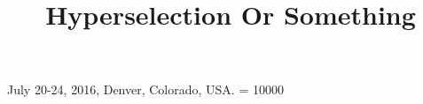 \documentclass{sig-alternate-05-2015}
\begin{document}








%
 {July 20-24, 2016, Denver, Colorado, USA.}
\widowpenalty = 10000

\title{Hyperselection Or Something}
%
%
%
%
%
\end{document}

